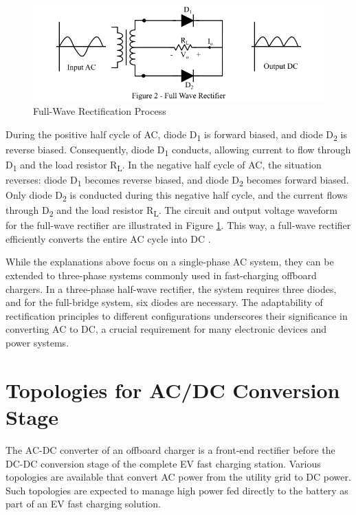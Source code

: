 \documentclass[12pt,a4paper]{book}
\begin{document}
\begin{figure}[h]
  \centering
  \includegraphics[width=13cm]{image2.png}
  \caption{Full-Wave Rectification Process}
  \label{fig:image2}
\end{figure}

During the positive half cycle of AC, diode D\textsubscript{1} is forward biased, and diode D\textsubscript{2} is reverse biased. Consequently, diode D\textsubscript{1} conducts, allowing current to flow through D\textsubscript{1} and the load resistor R\textsubscript{L}. In the negative half cycle of AC, the situation reverses: diode D\textsubscript{1} becomes reverse biased, and diode D\textsubscript{2} becomes forward biased. Only diode D\textsubscript{2} is conducted during this negative half cycle, and the current flows through D\textsubscript{2} and the load resistor R\textsubscript{L}. The circuit and output voltage waveform for the full-wave rectifier are illustrated in Figure \ref{fig:image2}. This way, a full-wave rectifier efficiently converts the entire AC cycle into DC \cite{rectifier2023}.

While the explanations above focus on a single-phase AC system, they can be extended to three-phase systems commonly used in fast-charging offboard chargers. In a three-phase half-wave rectifier, the system requires three diodes, and for the full-bridge system, six diodes are necessary. The adaptability of rectification principles to different configurations underscores their significance in converting AC to DC, a crucial requirement for many electronic devices and power systems.

\chapter{Topologies for AC/DC Conversion Stage}
The AC-DC converter of an offboard charger is a front-end rectifier before the DC-DC conversion stage of the complete EV fast charging station. Various topologies are available that convert AC power from the utility grid to DC power. Such topologies are expected to manage high power fed directly to the battery as part of an EV fast charging solution. 
\end{document}
